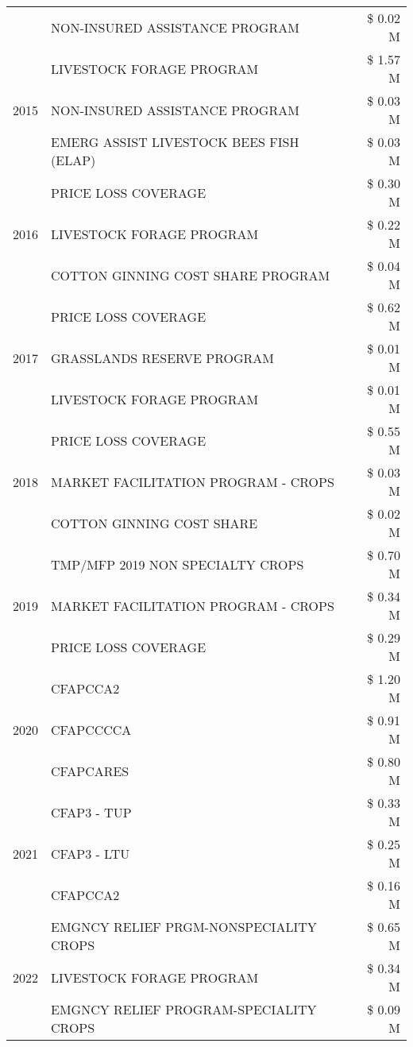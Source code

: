 \begin{tabular}{llr}
 & NON-INSURED ASSISTANCE PROGRAM & \$ 0.02 M \\
\cline{1-3}
\multirow[t]{3}{*}{2015} & LIVESTOCK FORAGE PROGRAM & \$ 1.57 M \\
 & NON-INSURED ASSISTANCE PROGRAM & \$ 0.03 M \\
 & EMERG ASSIST LIVESTOCK BEES FISH (ELAP) & \$ 0.03 M \\
\cline{1-3}
\multirow[t]{3}{*}{2016} & PRICE LOSS COVERAGE & \$ 0.30 M \\
 & LIVESTOCK FORAGE PROGRAM & \$ 0.22 M \\
 & COTTON GINNING COST SHARE PROGRAM & \$ 0.04 M \\
\cline{1-3}
\multirow[t]{3}{*}{2017} & PRICE LOSS COVERAGE & \$ 0.62 M \\
 & GRASSLANDS RESERVE PROGRAM & \$ 0.01 M \\
 & LIVESTOCK FORAGE PROGRAM & \$ 0.01 M \\
\cline{1-3}
\multirow[t]{3}{*}{2018} & PRICE LOSS COVERAGE & \$ 0.55 M \\
 & MARKET FACILITATION PROGRAM - CROPS & \$ 0.03 M \\
 & COTTON GINNING COST SHARE & \$ 0.02 M \\
\cline{1-3}
\multirow[t]{3}{*}{2019} & TMP/MFP 2019 NON SPECIALTY CROPS & \$ 0.70 M \\
 & MARKET FACILITATION PROGRAM - CROPS & \$ 0.34 M \\
 & PRICE LOSS COVERAGE & \$ 0.29 M \\
\cline{1-3}
\multirow[t]{3}{*}{2020} & CFAPCCA2 & \$ 1.20 M \\
 & CFAPCCCCA & \$ 0.91 M \\
 & CFAPCARES & \$ 0.80 M \\
\cline{1-3}
\multirow[t]{3}{*}{2021} & CFAP3 - TUP & \$ 0.33 M \\
 & CFAP3 - LTU & \$ 0.25 M \\
 & CFAPCCA2 & \$ 0.16 M \\
\cline{1-3}
\multirow[t]{3}{*}{2022} & EMGNCY RELIEF PRGM-NONSPECIALITY CROPS & \$ 0.65 M \\
 & LIVESTOCK FORAGE PROGRAM & \$ 0.34 M \\
 & EMGNCY RELIEF PROGRAM-SPECIALITY CROPS & \$ 0.09 M \\
\cline{1-3}
\bottomrule
\end{tabular}
